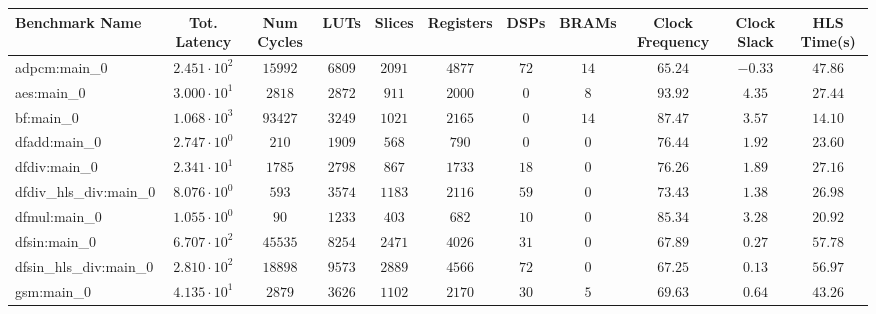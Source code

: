 \begin{tabular}{|l|c|c|c|c|c|c|c|c|c|c|}
\hline
Benchmark Name          & Tot. Latency           & Num Cycles & LUTs      & Slices    & Registers & DSPs    & BRAMs   & Clock Frequency & Clock Slack & HLS Time(s) \\
\hline
adpcm:main\_0           & $ 2.451 \cdot 10^{2} $ & $ 15992  $ & $ 6809  $ & $ 2091  $ & $ 4877  $ & $ 72  $ & $ 14  $ & $ 65.24       $ & $ -0.33   $ & $ 47.86   $ \\
aes:main\_0             & $ 3.000 \cdot 10^{1} $ & $ 2818   $ & $ 2872  $ & $ 911   $ & $ 2000  $ & $ 0   $ & $ 8   $ & $ 93.92       $ & $ 4.35    $ & $ 27.44   $ \\
bf:main\_0              & $ 1.068 \cdot 10^{3} $ & $ 93427  $ & $ 3249  $ & $ 1021  $ & $ 2165  $ & $ 0   $ & $ 14  $ & $ 87.47       $ & $ 3.57    $ & $ 14.10   $ \\
dfadd:main\_0           & $ 2.747 \cdot 10^{0} $ & $ 210    $ & $ 1909  $ & $ 568   $ & $ 790   $ & $ 0   $ & $ 0   $ & $ 76.44       $ & $ 1.92    $ & $ 23.60   $ \\
dfdiv:main\_0           & $ 2.341 \cdot 10^{1} $ & $ 1785   $ & $ 2798  $ & $ 867   $ & $ 1733  $ & $ 18  $ & $ 0   $ & $ 76.26       $ & $ 1.89    $ & $ 27.16   $ \\
dfdiv\_hls\_div:main\_0 & $ 8.076 \cdot 10^{0} $ & $ 593    $ & $ 3574  $ & $ 1183  $ & $ 2116  $ & $ 59  $ & $ 0   $ & $ 73.43       $ & $ 1.38    $ & $ 26.98   $ \\
dfmul:main\_0           & $ 1.055 \cdot 10^{0} $ & $ 90     $ & $ 1233  $ & $ 403   $ & $ 682   $ & $ 10  $ & $ 0   $ & $ 85.34       $ & $ 3.28    $ & $ 20.92   $ \\
dfsin:main\_0           & $ 6.707 \cdot 10^{2} $ & $ 45535  $ & $ 8254  $ & $ 2471  $ & $ 4026  $ & $ 31  $ & $ 0   $ & $ 67.89       $ & $ 0.27    $ & $ 57.78   $ \\
dfsin\_hls\_div:main\_0 & $ 2.810 \cdot 10^{2} $ & $ 18898  $ & $ 9573  $ & $ 2889  $ & $ 4566  $ & $ 72  $ & $ 0   $ & $ 67.25       $ & $ 0.13    $ & $ 56.97   $ \\
gsm:main\_0             & $ 4.135 \cdot 10^{1} $ & $ 2879   $ & $ 3626  $ & $ 1102  $ & $ 2170  $ & $ 30  $ & $ 5   $ & $ 69.63       $ & $ 0.64    $ & $ 43.26   $ \\

\end{tabular}

